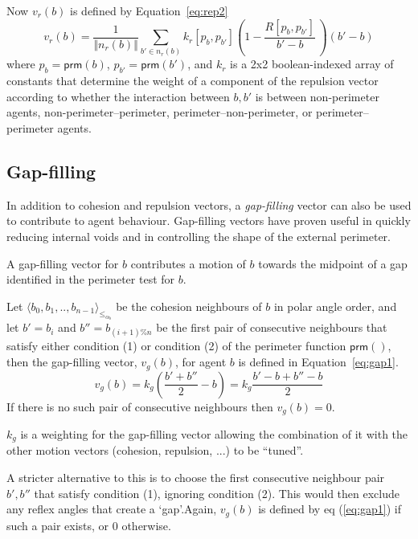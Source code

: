 \documentclass[12pt,a4paper]{IEEEtran}
\newcommand{\magn}[1]{\Vert{#1}\Vert}
\newcommand{\vbb}[2]{#2-#1}
\newcommand{\pangle}{\mathit{\alpha}}
\newcommand{\leqaz}[3]{#2 \leq_{\pangle_#1} #3}
\newcommand{\angleordered}[2]{\langle #2 \rangle_{\leqaz{#1}{}{}}}
\newcommand{\prm}{\mathsf{prm}}
\newcommand{\kr}{\mathit{k_{r}}}
\newcommand{\kg}{\mathit{k_{g}}}
\newcommand{\rb}{\mathit{R}}
\begin{document}
Now $v_r(b)$ is defined by Equation~\ref{eq:rep2}
\small
\begin{equation}\label{eq:rep2}
	v_r(b) = \frac{1}{\magn{n_r(b)}}\sum_{b' \in n_r(b)} \kr[p_b,p_{b'}] \left(1 - \frac{\rb[p_b,p_{b'}]}{\vbb{b}{b'}} \, \right) (\vbb{b}{b'})
\end{equation}
\normalsize
where $p_b = \prm(b)$, $p_{b'} = \prm(b')$, and $\kr$ is a 2x2 boolean-indexed
array of constants that determine the weight of a component of the repulsion
vector according to whether the interaction between $b,b'$ is between
non-perimeter agents, non-perimeter--perimeter, perimeter--non-perimeter, or
perimeter--perimeter agents.

\subsection{Gap-filling}

In addition to cohesion and repulsion vectors, a \emph{gap-filling} vector can
also be used to contribute to agent behaviour. Gap-filling vectors have proven
useful in quickly reducing internal voids and in controlling the shape of the
external perimeter.

A gap-filling vector for $b$ contributes a motion of $b$ towards the midpoint
of a gap identified in the perimeter test for $b$.

Let $\angleordered{b}{b_0, b_1, .., b_{n-1}}$ be the cohesion neighbours of $b$
in polar angle order, and let $b' = b_i$  and $b'' = b_{(i+1)\%n}$ be the first
pair of consecutive neighbours that satisfy either condition (1) or condition
(2) of the perimeter function $\prm()$, then the gap-filling vector, $v_g(b)$,
for agent $b$ is defined in Equation~\ref{eq:gap1}.
\small
\begin{equation}\label{eq:gap1}
v_g(b) = \kg \left (\frac{b' + b''}{2} - b \right) = \kg \frac{\vbb{b}{b'} + \vbb{b}{b''}}{2} 
\end{equation}
\normalsize
If there is no such pair of consecutive neighbours then $v_g(b) = 0$.

$\kg$ is a weighting for the gap-filling vector allowing the combination of it
with the other motion vectors (cohesion, repulsion, ...) to be ``tuned''.

A stricter alternative to this is to choose the first consecutive neighbour
pair $b',b''$ that satisfy condition (1), ignoring condition (2).  This would then exclude any reflex angles that create a `gap'.Again, $v_g(b)$ is defined by eq (\ref{eq:gap1}) if such a pair exists, or 0 otherwise.
\end{document}
